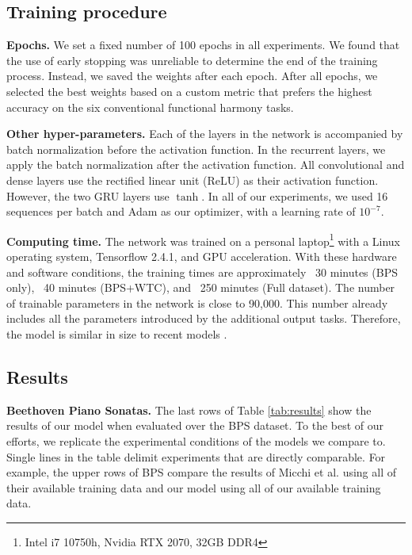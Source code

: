\documentclass{article}
\begin{document}
\subsection{Training procedure}

\textbf{Epochs.}
We set a fixed number of 100 epochs in all experiments. 
We found that the use of early stopping was unreliable to determine the end of the training process.
Instead, we saved the weights after each epoch. 
After all epochs, we selected the best weights based on a custom metric that prefers the highest accuracy on the six conventional functional harmony tasks.

\textbf{Other hyper-parameters.}
Each of the layers in the network is accompanied by batch normalization before the activation function. In the recurrent layers, we apply the batch normalization after the activation function. All convolutional and dense layers use the rectified linear unit (ReLU) as their activation function. However, the two GRU layers use $\tanh$. In all of our experiments, we used 16 sequences per batch and Adam \cite{kingma_adam_2014} as our optimizer, with a learning rate of $10^{-7}$.



\textbf{Computing time.} The network was trained on a personal laptop\footnote{Intel i7 10750h, Nvidia RTX 2070, 32GB DDR4} with a Linux operating system, Tensorflow 2.4.1, and GPU acceleration.
With these hardware and software conditions, the training times are approximately ~30 minutes (BPS only), ~40 minutes (BPS+WTC), and ~250 minutes (Full dataset). 
The number of trainable parameters in the network is close to 90,000. This number already includes all the parameters introduced by the additional output tasks. Therefore, the model is similar in size to recent models \cite{micchi_not_2020, chen_attend_2021}.

\subsection{Results}


\textbf{Beethoven Piano Sonatas.} The last rows of Table \ref{tab:results} show the results of our model when evaluated over the BPS dataset. 
To the best of our efforts, we replicate the experimental conditions of the models we compare to. Single lines in the table delimit experiments that are directly comparable. 
For example, the upper rows of BPS compare the results of Micchi et al. \cite{micchi_not_2020} using all of their available training data and our model using all of our available training data. 
\end{document}
